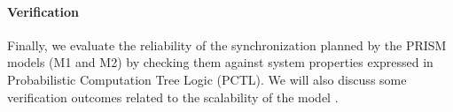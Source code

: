 \paragraph{Verification} Finally, we evaluate the reliability of the synchronization planned by the PRISM models (M1 and M2) by checking them against system properties expressed in Probabilistic Computation Tree Logic (PCTL). We will also discuss some verification outcomes related to the scalability of the model .

